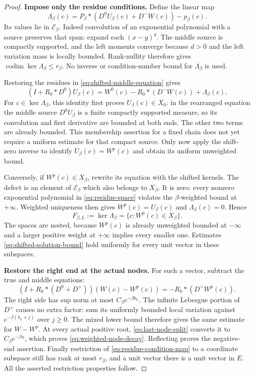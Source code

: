\begin{proof}
\smallskip\noindent\textbf{Impose only the residue conditions.}
Define the linear map
\begin{equation}\label{eq:residue-condition-map}
 \Lambda_\beta(c)
  =P_\beta*(D^0U_\beta(c)+D^-W(c))-p_\beta(c).
\end{equation}
Its values lie in $\mathcal E_\beta$.  Indeed convolution of an
exponential polynomial with a source preserves that span:
expand each $(x-y)^q$.  The middle source is compactly supported,
and the left moments converge because $d>0$ and the left
variation mass is locally bounded.  Rank-nullity therefore gives
$\operatorname{codim}\ker\Lambda_\beta\le r_\beta$.
No inverse or condition-number bound for $\Lambda_\beta$ is used.

Restoring the residues in \eqref{eq:shifted-middle-equation} gives
\[
 (I+R_0*D^0)U_\beta(c)
  =W^0(c)-R_0*(D^-W(c))+\Lambda_\beta(c).
\]
For $c\in\ker\Lambda_\beta$, this identity first proves
$U_\beta(c)\in X_0$: in the rearranged equation the middle
source $D^0U_\beta$ is a finite compactly supported measure,
so its convolution and first derivative are bounded at both
ends.  The other two terms are already bounded.
This membership assertion for a fixed chain does not yet require
a uniform estimate for that compact source.  Only now apply the
shift-zero inverse to identify $U_\beta(c)=W^p(c)$ and obtain
its uniform unweighted bound.

Conversely, if $W^p(c)\in X_\beta$, rewrite its equation with
the shifted kernels.  The defect is an element of
$\mathcal E_\beta$ which also belongs to $X_\beta$.
It is zero: every nonzero exponential polynomial in
\eqref{eq:residue-space} violates the $\beta$-weighted bound at
$+\infty$.  Weighted uniqueness then gives
$W^p(c)=U_\beta(c)$ and $\Lambda_\beta(c)=0$.
Hence
\begin{equation}\label{eq:flag-membership}
 F_{\beta,L}:=\ker\Lambda_\beta
       =\{c:W^p(c)\in X_\beta\}.
\end{equation}
The spaces are nested, because $W^p(c)$ is already unweighted
bounded at $-\infty$ and a larger positive weight at $+\infty$
implies every smaller one.  Estimates
\eqref{eq:shifted-solution-bound} hold uniformly for every unit
vector in these subspaces.

\smallskip\noindent\textbf{Restore the right end at the actual nodes.}
For such a vector, subtract the true and middle equations:
\[
 (I+R_0*(D^0+D^+))(W(c)-W^p(c))
       =-R_0*(D^+W^p(c)).
\]
The right side has sup norm at most $C_\beta e^{-\beta b_L}$.
The infinite Lebesgue portion of $D^+$ causes no extra factor:
sum its uniformly bounded local variation against
$e^{-\beta(b_L+j)}$ over $j\ge0$.
The mixed lower bound therefore gives the same estimate for
$W-W^p$.  At every actual positive root,
\eqref{eq:last-node-split} converts it to
$C_\beta e^{-\beta u}$, which proves
\eqref{eq:weighted-node-decay}.
Reflecting proves the negative-end assertion.
Finally restriction of \eqref{eq:residue-condition-map} to a
coordinate subspace still has rank at most $r_\beta$, and a unit
vector there is a unit vector in $E$.  All the asserted
restriction properties follow.
\end{proof}


